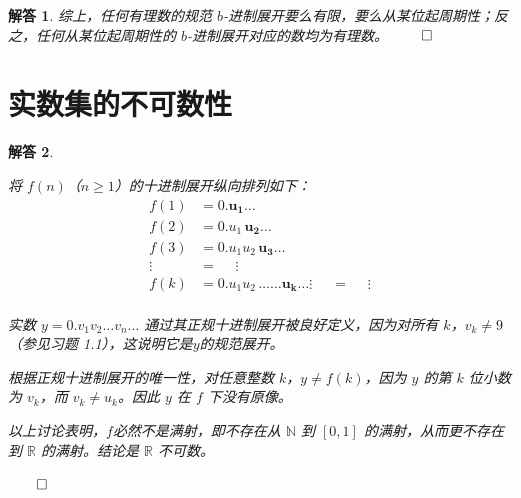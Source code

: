 \documentclass[12pt,UTF8,fontset=none]{ctexbook}
\theoremstyle{exercisestyle}
\theoremstyle{solutionstyle}
\newtheorem*{solution*}{解答}
\newenvironment{solution}
  {\begin{solution*}}
  {\hfill\ensuremath{\qed}\end{solution*}}
\begin{document}
\begin{solution}
综上，任何有理数的规范 $b$-进制展开要么有限，要么从某位起周期性；反之，任何从某位起周期性的 $b$-进制展开对应的数均为有理数。
\end{solution}

\section{实数集的不可数性}\label{non-dénombrabilité-de-r}
\begin{solution}
\begin{subquestions}
\item 将 $f(n)$（$n \geq 1$）的十进制展开纵向排列如下：
\begin{align*}
f(1) &= 0.\mathbf{u_1}\ldots \\
f(2) &= 0.u_1\,\mathbf{u_2}\ldots \\
f(3) &= 0.u_1u_2\,\mathbf{u_3}\ldots \\
\vdots\;\; &= \quad \;\vdots \\
f(k) &= 0.u_1u_2\,\ldots\ldots \mathbf{u_k}\ldots
\vdots\;\; &= \quad \;\vdots \\
\end{align*}

实数 $y = 0.v_1 v_2 \ldots v_n \ldots$ 通过其正规十进制展开被良好定义，因为对所有 $k$，$v_k \neq 9$（参见习题 1.1），这说明它是$y$的规范展开。

\item 根据正规十进制展开的唯一性，对任意整数 $k$，$y \neq f(k)$，因为 $y$ 的第 $k$ 位小数为 $v_k$，而 $v_k \neq u_k$。因此 $y$ 在 $f$ 下没有原像。

\item 以上讨论表明，$f$必然不是满射，即不存在从 $\mathbb{N}$ 到 $[0,1]$ 的满射，从而更不存在到 $\mathbb{R}$ 的满射。结论是 $\mathbb{R}$ 不可数。
\end{subquestions}
\end{solution}
\end{document}
